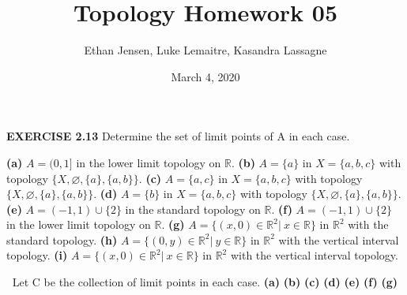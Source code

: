 \documentclass[12pt]{article}
\title{Topology Homework 05}
\author{Ethan Jensen, Luke Lemaitre, Kasandra Lassagne}
\date{March 4, 2020}
\begin{document}
  \maketitle
  \noindent
  \textbf{EXERCISE 2.13} Determine the set of limit points of A in each case.
  \begin{adjustwidth}{1cm}{0cm}
    \begin{flushleft}
      \textbf{(a)} \(A = (0,1]\) in the lower limit topology on \(\mathbb{R}\). \newline
      \textbf{(b)} \(A = \{a\}\) in \(X = \{a,b,c\}\) with topology \(\{X, \varnothing, \{a\}, \{a,b\}\}\). \newline
      \textbf{(c)} \(A = \{a,c\}\) in \(X = \{a,b,c\}\) with topology \(\{X, \varnothing, \{a\}, \{a,b\}\}\). \newline
      \textbf{(d)} \(A = \{b\}\) in \(X = \{a,b,c\}\) with topology \(\{X, \varnothing, \{a\}, \{a,b\}\}\). \newline
      \textbf{(e)} \(A = (-1,1) \cup \{2\}\) in the standard topology on \(\mathbb{R}\). \newline
      \textbf{(f)} \(A = (-1,1) \cup \{2\}\) in the lower limit topology on \(\mathbb{R}\). \newline
      \textbf{(g)} \(A = \{(x,0)\in\mathbb{R}^2|\ x \in \mathbb{R}\}\) in \(\mathbb{R}^2\) with the standard topology. \newline
      \textbf{(h)} \(A = \{(0,y) \in \mathbb{R}^2|\ y \in \mathbb{R}\}\) in \(\mathbb{R}^2\) with the vertical interval topology. \newline
      \textbf{(i)} \(A = \{(x,0)\in\mathbb{R}^2|\ x \in \mathbb{R}\}\) in \(\mathbb{R}^2\) with the vertical interval topology.
    \end{flushleft}
  \end{adjustwidth}
  \(\ \) \newline
  Let C be the collection of limit points in each case.
  \newline
  \newline
  \textbf{(a)}  \newline
  \textbf{(b)}  \newline
  \textbf{(c)}  \newline
  \textbf{(d)}  \newline
  \textbf{(e)}  \newline
  \textbf{(f)} \boxed{C = [-1,1)} \newline
  \textbf{(g)}  \newline
\end{document}
